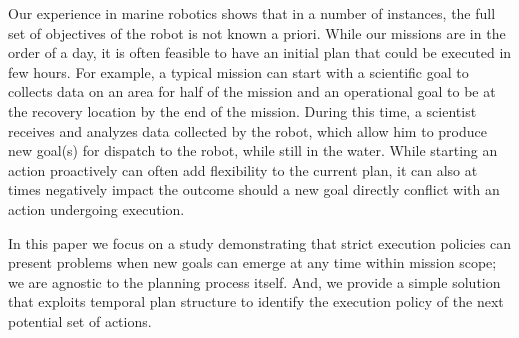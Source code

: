 Our experience in marine robotics shows that in a number of instances,
the full set of objectives of the robot is not known a priori. While
our missions are in the order of a day, it is often feasible to have
an initial plan that could be executed in few hours. For example, a
typical mission can start with a scientific goal to collects data on
an area for half of the mission and an operational goal to be at the
recovery location by the end of the mission. During this time, a
scientist receives and analyzes data collected by the robot, which
allow him to produce new goal(s) for dispatch to the robot, while
still in the water.  While starting an action proactively can often
add flexibility to the current plan, it can also at times negatively
impact the outcome should a new goal directly conflict with an action
undergoing execution.

In this paper we focus on a study demonstrating that strict execution
policies can present problems when new goals can emerge at any time
within mission scope; we are agnostic to the planning process
itself. And, we provide a simple solution that exploits temporal plan
structure to identify the execution policy of the next potential set
of actions. %




